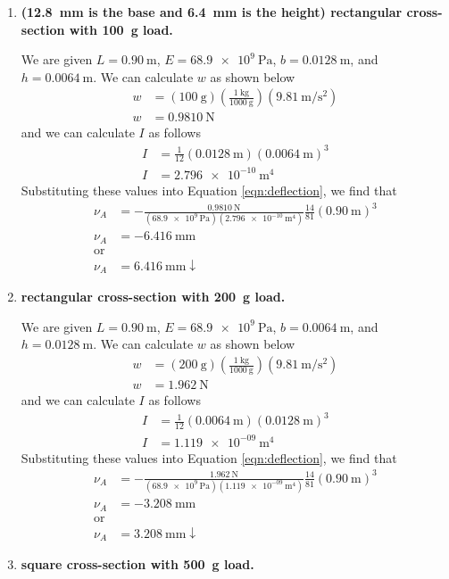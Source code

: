 \documentclass[12 pt]{article}
\begin{document}
\begin{enumerate}[label=(\Alph*)]
	\item \textbf{ (\qty{12.8}{\milli\meter} is the base and \qty{6.4}{\milli\meter} is the height) rectangular cross-section with \qty{100}{\gram} load.}
	
	We are given $L=\qty{0.90}{\m}$, $E=\qty{68.9e9}{\Pa}$, $b=\qty{0.0128}{\m}$, and $h=\qty{0.0064}{\m}$. We can calculate $w$ as shown below
	\begin{align*}
		w&=(\qty{100}{\g})\left(\frac{\qty{1}{\kg}}{\qty{1000}{\g}}\right)\left(\qty[per-mode=fraction]{9.81}{\m\per\s\squared}\right)\\
		w&=\qty{0.9810}{\N}
	\end{align*}
	and we can calculate $I$ as follows
	\begin{align*}
		I&=\frac{1}{12}(\qty{0.0128}{\m})(\qty{0.0064}{\m})^3\\
		I&=\qty{2.796e-10}{\m^4}
	\end{align*}
	Substituting these values into Equation \ref{eqn:deflection}, we find that
	\begin{align*}
		\nu_A&=-\frac{\qty{0.9810}{\N}}{(\qty{68.9e9}{\Pa})(\qty{2.796e-10}{\m^4})}\frac{14}{81}(\qty{0.90}{\m})^3\\
		\nu_A&=\qty{-6.416}{\mm}\\
		\text{or}\\
		\nu_A&=\qty{6.416}{\mm}\downarrow
	\end{align*}
	\item \textbf{ rectangular cross-section with \qty{200}{\gram} load.}
	
	We are given $L=\qty{0.90}{\m}$, $E=\qty{68.9e9}{\Pa}$, $b=\qty{0.0064}{\m}$, and $h=\qty{0.0128}{\m}$. We can calculate $w$ as shown below
	\begin{align*}
		w&=(\qty{200}{\g})\left(\frac{\qty{1}{\kg}}{\qty{1000}{\g}}\right)\left(\qty[per-mode=fraction]{9.81}{\m\per\s\squared}\right)\\
		w&=\qty{1.962}{\N}
	\end{align*}
	and we can calculate $I$ as follows
	\begin{align*}
		I&=\frac{1}{12}(\qty{0.0064}{\m})(\qty{0.0128}{\m})^3\\
		I&=\qty{1.119e-09}{\m^4}
	\end{align*}
	Substituting these values into Equation \ref{eqn:deflection}, we find that
	\begin{align*}
		\nu_A&=-\frac{\qty{1.962}{\N}}{(\qty{68.9e9}{\Pa})(\qty{1.119e-09}{\m^4})}\frac{14}{81}(\qty{0.90}{\m})^3\\
		\nu_A&=\qty{-3.208}{\mm}\\
		\text{or}\\
		\nu_A&=\qty{3.208}{\mm}\downarrow
	\end{align*}
	\item \textbf{ square cross-section with \qty{500}{\gram} load.}
	

\end{enumerate}
\end{document}
